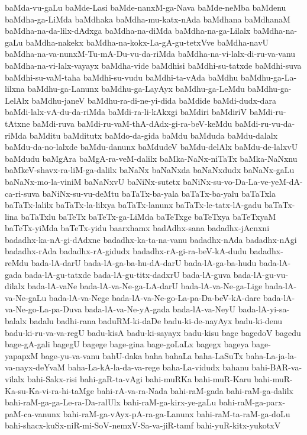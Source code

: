 {baMda-vu-gaLu
baMde-Lasi
baMde-nanxM-ga-Nava
baMde-neMba
baMdenu
baMdha-ga-LiMda
baMdhaka
baMdha-mu-katx-nAda
baMdhana
baMdhanaM
baMdha-na-da-lilx-dAdxga
baMdha-na-diMda
baMdha-na-ga-Lilalx
baMdha-na-gaLu
baMdha-nakekx
baMdha-na-kokx-La-gA-gu-tetxVve
baMdha-navU
baMdha-na-va-nunxM-Tu-mA-Du-vu-da-riMda
baMdha-na-vi-lalx-di-ru-va-vanu
baMdha-na-vi-lalx-vayayx
baMdha-vide
baMdhisi
baMdhi-su-tatxde
baMdhi-suva
baMdhi-su-vaM-taha
baMdhi-su-vudu
baMdhi-ta-vAda
baMdhu
baMdhu-ga-La-lilxna
baMdhu-ga-Lanunx
baMdhu-ga-LayAyx
baMdhu-ga-LeMdu
baMdhu-ga-LelAlx
baMdhu-janeV
baMdhu-ra-di-ne-yi-dida
baMdide
baMdi-dudx-dara
baMdi-lalx-vA-du-da-riMda
baMdi-ra-li-kAkxgi
baMdiri
baMdiriV
baMdi-ru-tAtxne
baMdi-ruva
baMdi-ru-vaM-thA-dAdx-gi-ra-beV-keMdu
baMdi-ru-vu-da-riMda
baMditu
baMditutx
baMdo-da-gida
baMdu
baMduda
baMdu-dalalx
baMdu-da-no-lalxde
baMdu-danunx
baMdudeV
baMdu-delAlx
baMdu-de-lalxvU
baMdudu
baMgAra
baMgA-ra-veM-dalilx
baMka-NaNx-niTaTx
baMka-NaNxnu
baMkeV-shavx-ra-liM-ga-dalilx
baNaNx
baNaNxda
baNaNxdudx
baNaNx-gaLu
baNaNx-mo-la-viniM
baNaNxvU
baNiNx-sutetx
baNiNx-su-vo-Da-La-ve-yeM-dA-ca-ri-suva
baNiNx-su-vu-deMtu
baTaTx-ba-yala
baTaTx-ba-yalu
baTaTxla
baTaTx-lalilx
baTaTx-la-lilxya
baTaTx-lanunx
baTaTx-le-tatx-lA-gadu
baTaTx-lina
baTaTxlu
baTeTx
baTeTx-ga-LiMda
baTeTxge
baTeTxya
baTeTxyaM
baTeTx-yiMda
baTeTx-yidu
baarxhamx
badAdhx-sana
badadhx-jAcnxni
badadhx-ka-nA-gi-dAdxne
badadhx-ka-ta-na-vanu
badadhx-nAda
badadhx-nAgi
badadhx-rAda
badadhx-rA-gidudx
badadhx-rA-gi-ra-beV-kA-dudu
badadhx-reMdu
bada-lA-darU
bada-lA-ga-ba-hu-dA-darU
bada-lA-ga-ba-hudu
bada-lA-gada
bada-lA-gu-tatxde
bada-lA-gu-titx-dadxrU
bada-lA-guva
bada-lA-gu-vu-dilalx
bada-lA-vaNe
bada-lA-va-Ne-ga-LA-darU
bada-lA-va-Ne-ga-Lige
bada-lA-va-Ne-gaLu
bada-lA-va-Nege
bada-lA-va-Ne-go-La-pa-Da-beV-kA-dare
bada-lA-va-Ne-go-La-pa-Duva
bada-lA-va-Ne-yA-gada
bada-lA-va-NeyU
bada-lA-yi-sa-balalx
badalu
badhi-rana
baduRM-ki-daDe
badu-ki-de-nayAyx
badu-ki-denu
badu-ki-ru-va-va-regU
badu-kisA
badu-ki-sayayx
badu-kisu
bage
bagedoV
bagedu
bage-gA-gali
bagegU
bagege
bage-gina
bage-goLaLx
bagegx
bageya
bage-yapapxM
bage-yu-va-vanu
bahU-daka
baha
bahaLa
baha-LaSuTx
baha-La-ja-la-va-nayx-deYvaM
baha-La-kA-la-da-va-rege
baha-La-vidudx
bahanu
bahi-BAR-va-vilalx
bahi-Sakx-risi
bahi-gaR-ta-vAgi
bahi-muRKa
bahi-muR-Karu
bahi-muR-Ka-su-Ka-vi-ra-hi-taMge
bahi-rA-va-ra-Nada
bahi-raM-gada
bahi-raM-ga-dalilx
bahi-raM-ga-ga-Le-ra-Da-ralUlx
bahi-raM-ga-kirx-ye-gaLu
bahi-raM-ga-parx-paM-ca-vanunx
bahi-raM-ga-vAyx-pA-ra-ga-Lanunx
bahi-raM-ta-raM-ga-doLu
bahi-shacx-kuSx-niR-mi-SoV-nemxV-Sa-va-jiR-tamf
bahi-yuR-kitx-yukotxV
}

